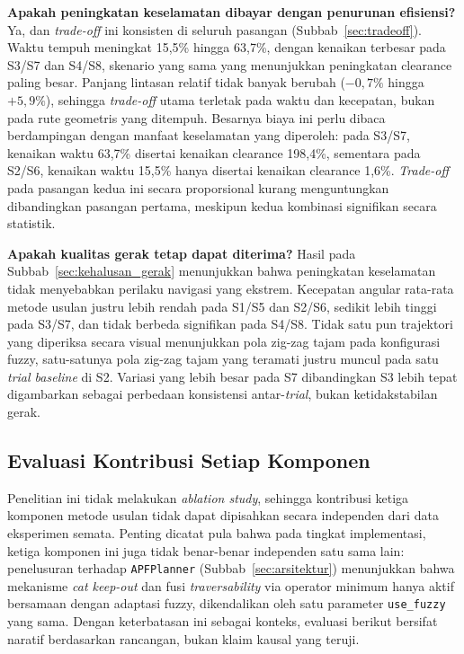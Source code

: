 \textbf{Apakah peningkatan keselamatan dibayar dengan penurunan efisiensi?}
Ya, dan \textit{trade-off} ini konsisten di seluruh pasangan
(Subbab~\ref{sec:tradeoff}). Waktu tempuh meningkat 15,5\% hingga 63,7\%,
dengan kenaikan terbesar pada S3/S7 dan S4/S8, skenario yang sama yang
menunjukkan peningkatan clearance paling besar. Panjang lintasan relatif
tidak banyak berubah ($-0,7\%$ hingga $+5,9\%$), sehingga \textit{trade-off}
utama terletak pada waktu dan kecepatan, bukan pada rute geometris yang
ditempuh. Besarnya biaya ini perlu dibaca berdampingan dengan manfaat
keselamatan yang diperoleh: pada S3/S7, kenaikan waktu 63,7\% disertai
kenaikan clearance 198,4\%, sementara pada S2/S6, kenaikan waktu 15,5\%
hanya disertai kenaikan clearance 1,6\%. \textit{Trade-off} pada pasangan
kedua ini secara proporsional kurang menguntungkan dibandingkan pasangan
pertama, meskipun kedua kombinasi signifikan secara statistik.

\textbf{Apakah kualitas gerak tetap dapat diterima?} Hasil pada
Subbab~\ref{sec:kehalusan_gerak} menunjukkan bahwa peningkatan keselamatan
tidak menyebabkan perilaku navigasi yang ekstrem. Kecepatan angular rata-rata
metode usulan justru lebih rendah pada S1/S5 dan S2/S6, sedikit lebih tinggi
pada S3/S7, dan tidak berbeda signifikan pada S4/S8. Tidak satu pun trajektori
yang diperiksa secara visual menunjukkan pola zig-zag tajam pada konfigurasi
fuzzy, satu-satunya pola zig-zag tajam yang teramati justru muncul pada satu
\textit{trial baseline} di S2. Variasi yang lebih besar pada S7 dibandingkan
S3 lebih tepat digambarkan sebagai perbedaan konsistensi antar-\textit{trial},
bukan ketidakstabilan gerak.

\subsection{Evaluasi Kontribusi Setiap Komponen}

Penelitian ini tidak melakukan \textit{ablation study}, sehingga kontribusi
ketiga komponen metode usulan tidak dapat dipisahkan secara independen dari
data eksperimen semata. Penting dicatat pula bahwa pada tingkat implementasi,
ketiga komponen ini juga tidak benar-benar independen satu sama lain:
penelusuran terhadap \texttt{APFPlanner} (Subbab~\ref{sec:arsitektur})
menunjukkan bahwa mekanisme \textit{cat keep-out} dan fusi
\textit{traversability} via operator minimum hanya aktif bersamaan dengan
adaptasi fuzzy, dikendalikan oleh satu parameter \texttt{use\_fuzzy} yang
sama. Dengan keterbatasan ini sebagai konteks, evaluasi berikut bersifat
naratif berdasarkan rancangan, bukan klaim kausal yang teruji.

